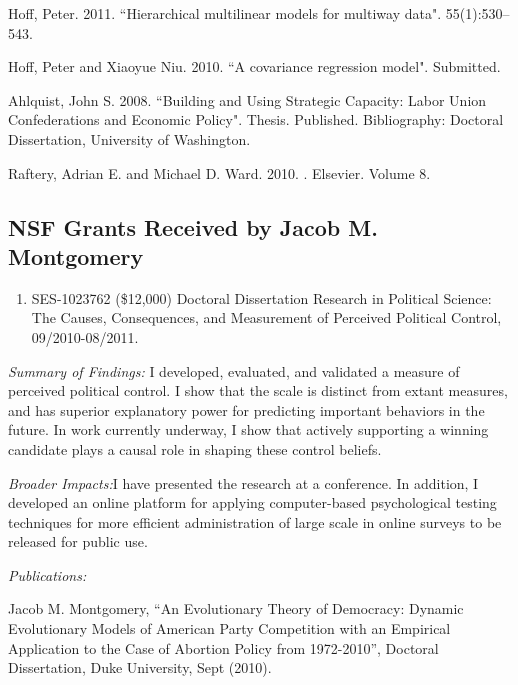 \documentclass[pdftex,12pt,fullpage,oneside]{amsart}
\begin{document}
\begin{list}{}{\leftmargin=1em}
\item Hoff, Peter. 2011. ``Hierarchical multilinear models for multiway
  data".  55(1):530--543.

\item Hoff, Peter and Xiaoyue Niu. 2010. ``A covariance regression model".  Submitted.


\item  Ahlquist, John S. 2008. ``Building and Using Strategic Capacity: Labor Union Confederations and Economic Policy". Thesis. Published. %
Bibliography: Doctoral Dissertation, University of Washington.

\item  Raftery, Adrian E. and Michael D. Ward. 2010. . %
Elsevier. Volume 8.
\end{list}

 \subsection{NSF Grants Received by Jacob M. Montgomery}
\begin{enumerate}
\item SES-1023762  (\$12,000) Doctoral Dissertation Research in Political Science: The Causes, Consequences, and Measurement of Perceived Political Control, 09/2010-08/2011.    
\end{enumerate}

\textit{Summary of Findings:} I developed, evaluated, and validated a
measure of perceived political control. I show that the scale is
distinct from extant measures, and has superior explanatory power for
predicting important behaviors in the future. In work currently
underway, I show that actively supporting a winning candidate plays a
causal role in shaping these control beliefs.

\textit{Broader Impacts:}I have presented the research at a
conference.  In addition, I developed an online platform for applying
computer-based psychological testing techniques for more efficient
administration of large scale in online surveys to be released for
public use.

\textit{Publications:}

\begin{list}{}{\leftmargin=1em} \small
\item Jacob M. Montgomery, ``An Evolutionary Theory of Democracy:
  Dynamic Evolutionary Models of American Party Competition with an
  Empirical Application to the Case of Abortion Policy from
  1972-2010'', Doctoral Dissertation, Duke University, Sept (2010).
\end{list}
\end{document}
